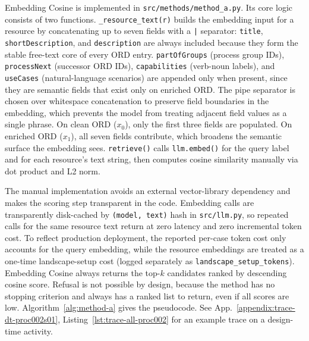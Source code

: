 Embedding Cosine is implemented in \texttt{src/methods/method\_a.py}. Its core logic consists of two functions. \texttt{\_resource\_text(r)} builds the embedding input for a resource by concatenating up to seven fields with a \texttt{|} separator: \texttt{title}, \texttt{shortDescription}, and \texttt{description} are always included because they form the stable free-text core of every ORD entry. \texttt{partOfGroups} (process group IDs), \texttt{processNext} (successor ORD IDs), \texttt{capabilities} (verb-noun labels), and \texttt{useCases} (natural-language scenarios) are appended only when present, since they are semantic fields that exist only on enriched ORD. The pipe separator is chosen over whitespace concatenation to preserve field boundaries in the embedding, which prevents the model from treating adjacent field values as a single phrase. On clean ORD ($x_0$), only the first three fields are populated. On enriched ORD ($x_1$), all seven fields contribute, which broadens the semantic surface the embedding sees. \texttt{retrieve()} calls \texttt{llm.embed()} for the query label and for each resource's text string, then computes cosine similarity manually via dot product and L2 norm. 

The manual implementation avoids an external vector-library dependency and makes the scoring step transparent in the code. Embedding calls are transparently disk-cached by \texttt{(model, text)} hash in \texttt{src/llm.py}, so repeated calls for the same resource text return at zero latency and zero incremental token cost. To reflect production deployment, the reported per-case token cost only accounts for the query embedding, while the resource embeddings are treated as a one-time landscape-setup cost (logged separately as \texttt{landscape\_setup\_tokens}). Embedding Cosine always returns the top-$k$ candidates ranked by descending cosine score. Refusal is not possible by design, because the method has no stopping criterion and always has a ranked list to return, even if all scores are low. Algorithm~\ref{alg:method-a} gives the pseudocode. See App.~\ref{appendix:trace-dt-proc002s01}, Listing~\ref{lst:trace-all-proc002} for an example trace on a design-time activity.



